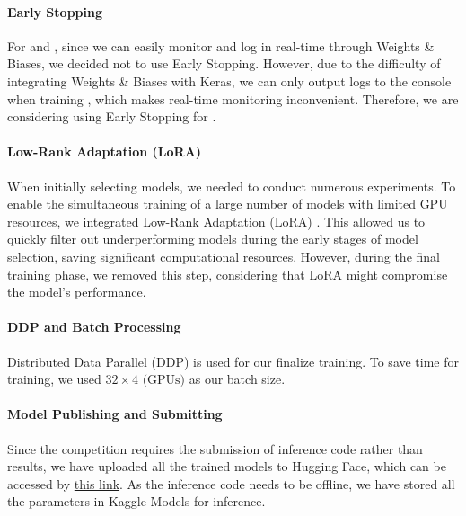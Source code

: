 \paragraph{Early Stopping} For \CONV and \VIT, since we can easily monitor and log in real-time through Weights \& Biases, we decided not to use Early Stopping. However, due to the difficulty of integrating Weights \& Biases with Keras, we can only output logs to the console when training \CROP, which makes real-time monitoring inconvenient. Therefore, we are considering using Early Stopping for \CROP.

\paragraph{Low-Rank Adaptation (LoRA)} When initially selecting models, we needed to conduct numerous experiments. To enable the simultaneous training of a large number of models with limited GPU resources, we integrated Low-Rank Adaptation (LoRA) \cite{hu2021lora}. This allowed us to quickly filter out underperforming models during the early stages of model selection, saving significant computational resources. However, during the final training phase, we removed this step, considering that LoRA might compromise the model's performance.

\paragraph{DDP and Batch Processing} Distributed Data Parallel (DDP) \cite{li2020pytorchdistributedexperiencesaccelerating} is used for our finalize training. To save time for training, we used $32\times 4\text{ (GPUs)}$ as our batch size.

\paragraph{Model Publishing and Submitting} Since the competition requires the submission of inference code rather than results, we have uploaded all the trained models to Hugging Face, which can be accessed by \href{https://huggingface.co/collections/pufanyi/sc4000-6717aaebf10b0e67e9a34a0d}{this link}. As the inference code needs to be offline, we have stored all the parameters in Kaggle Models for inference.
